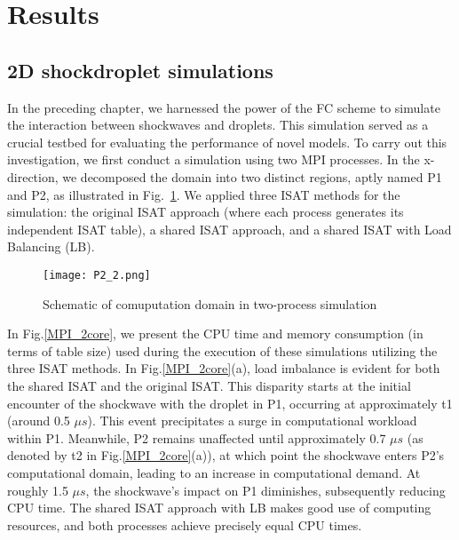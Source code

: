 \section{Results}

\subsection{2D shockdroplet simulations}


In the preceding chapter, we harnessed the power of the FC scheme to simulate the interaction between shockwaves and droplets. This simulation served as a crucial testbed for evaluating the performance of novel models. To carry out this investigation, we first conduct a simulation using two MPI processes. In the x-direction, we decomposed the domain into two distinct regions, aptly named P1 and P2, as illustrated in Fig.~\ref{MPI_P2}. We applied three ISAT methods for the simulation: the original ISAT approach (where each process generates its independent ISAT table), a shared ISAT approach, and a shared ISAT with Load Balancing (LB).
\begin{figure}[htbp]
    \centering
\texttt{[image: P2\_2.png]} 
\caption{Schematic of comuputation domain in  two-process simulation}
\label{MPI_P2} 
\end{figure}



In Fig.\ref{MPI_2core}, we present the CPU time and memory consumption (in terms of table size) used during the execution of these simulations utilizing the three ISAT methods. In Fig.\ref{MPI_2core}(a), load imbalance is evident for both the shared ISAT and the original ISAT. This disparity starts at the initial encounter of the shockwave with the droplet in P1, occurring at approximately t1 (around 0.5 $\mu s$). This event precipitates a surge in computational workload within P1. Meanwhile, P2 remains unaffected until approximately 0.7 $\mu s$ (as denoted by t2 in Fig.\ref{MPI_2core}(a)), at which point the shockwave enters P2's computational domain, leading to an increase in computational demand. At roughly 1.5 $\mu s$, the shockwave's impact on P1 diminishes, subsequently reducing CPU time. The shared ISAT approach with LB makes good use of computing resources, and both processes achieve precisely equal CPU times.

